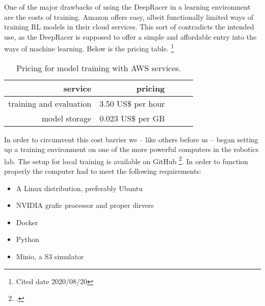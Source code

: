  One of the major drawbacks of using the DeepRacer in a learning environment are the costs of training. Amazon offers easy, albeit functionally limited ways of training RL models in their cloud services. This sort of contradicts the intended use, as the DeepRacer is supposed to offer a simple and affordable entry into the ways of machine learning. Below is the pricing table. \footnote{Cited date 2020/08/20}
 \begin{table}
 \caption{Pricing for model training with AWS services.}
 \label{tab:services}
 \centering
 \setlength{\tabcolsep}{5mm}
 \def\arraystretch{1.25}
 \begin{tabular}{|r|r|c|c|c|}
 \hline
 \textbf{service} & \textbf{pricing} \\
 \hline\hline
 training and evaluation & 3.50 US\$ per hour \\
 \hline
 model storage & 0.023 US\$ per GB \\
 \hline
 \end{tabular}
 \end{table}
 In order to circumvent this cost barrier we -- like others before us -- began setting up a training environment on one of the more powerful computers in the robotics lab.
 The setup for local training is available on GitHub \footcite{https://github.com/aws-deepracer-community/deepracer}. In order to function properly the computer had to meet the following requirements:
 \begin{itemize}
 \item A Linux distribution, preferably Ubuntu
 \item NVIDIA grafic processor and proper dirvers
 \item Docker
 \item Python
 \item Minio, a S3 simulator
 \end{itemize}